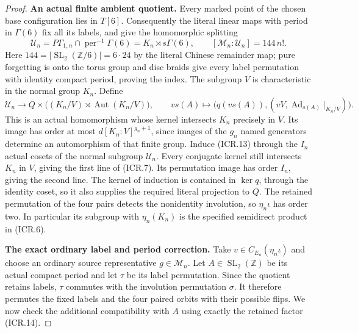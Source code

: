 \begin{proof}
\par\medskip\noindent\textbf{An actual finite ambient quotient.}\quad
Every marked point of the chosen base configuration lies in $T[6]$.
Consequently the literal linear maps with period in $\Gamma(6)$
fix all its labels, and give the homomorphic splitting
\[
 \mathcal U_n=P\Gamma_{1,n}\cap\operatorname{per}^{-1}\Gamma(6)
             =K_n\rtimes s\Gamma(6),\qquad
 [\mathcal M_n:\mathcal U_n]=144\,n!.
                                                               \tag{ICR.12}
\]
Here $144=|\operatorname{SL}_2(\mathbb Z/6)|=6\cdot24$ by the
literal Chinese remainder map; pure forgetting is onto the torus
group and disc braids give every label permutation with identity
compact period, proving the index.  The subgroup $V$ is
characteristic in the normal group $K_n$.  Define
\[
 \mathcal U_n\longrightarrow
 Q\times\bigl((K_n/V)\rtimes\operatorname{Aut}(K_n/V)\bigr),
 \qquad v s(A)\longmapsto
       \bigl(q(vs(A)),(vV,\operatorname{Ad}_{s(A)}|_{K_n/V})\bigr).
                                                               \tag{ICR.13}
\]
This is an actual homomorphism whose kernel intersects $K_n$
precisely in $V$.  Its image has order at most
$d[K_n:V]^{g_n+1}$, since images of the $g_n$ named generators
determine an automorphism of that finite group.
Induce (ICR.13) through the $I_n$ actual cosets of the normal
subgroup $\mathcal U_n$.  Every conjugate kernel still intersects
$K_n$ in $V$, giving the first line of (ICR.7).  Its permutation
image has order $I_n$, giving the second line.  The kernel of
induction is contained in $\ker q$, through the identity coset,
so it also supplies the required literal projection to $Q$.
The retained permutation of the four pairs detects the nonidentity
involution, so $\eta_n\iota$ has order two.  In particular its
subgroup with $\eta_n(K_n)$ is the specified semidirect product
in (ICR.6).

\par\medskip\noindent\textbf{The exact ordinary label and period correction.}\quad
Take $v\in C_{E_n}(\eta_n\iota)$ and choose an ordinary source
representative $g\in\mathcal M_n$.  Let $A\in\operatorname{SL}_2(\mathbb Z)$
be its actual compact period and let $\tau$ be its label permutation.
Since the quotient retains labels, $\tau$ commutes with the
involution permutation $\sigma$.  It therefore permutes the fixed
labels and the four paired orbits with their possible flips.
We now check the additional compatibility with $A$ using exactly
the retained factor (ICR.14).


\end{proof}
